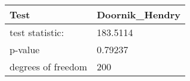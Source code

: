 \begin{tabular}{ll}
Test & Doornik_Hendry \\ 
\hline 
test statistic: & 183.5114 \\ 
p-value & 0.79237 \\ 
degrees of freedom & 200 \\ 
\hline 
\end{tabular}